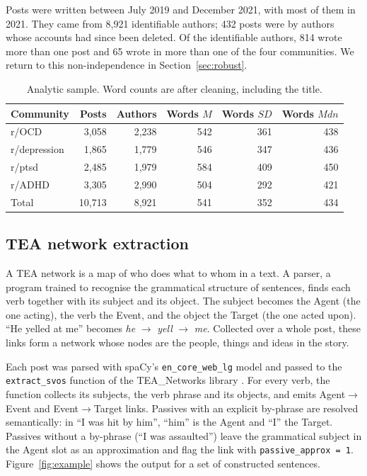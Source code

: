 \documentclass[11pt,a4paper]{article}
\begin{document}
Posts were written between July 2019 and December 2021, with most of them in 2021. They came from 8,921 identifiable authors; 432 posts were by authors whose accounts had since been deleted. Of the identifiable authors, 814 wrote more than one post and 65 wrote in more than one of the four communities. We return to this non-independence in Section~\ref{sec:robust}.

\begin{table}[t]
\centering
\caption{Analytic sample. Word counts are after cleaning, including the title.}
\label{tab:data}
\small
\begin{tabular}{@{}lrrrrr@{}}
\toprule
Community & Posts & Authors & Words $M$ & Words $SD$ & Words $Mdn$ \\
\midrule
r/OCD        & 3,058 & 2,238 & 542 & 361 & 438 \\
r/depression & 1,865 & 1,779 & 546 & 347 & 436 \\
r/ptsd       & 2,485 & 1,979 & 584 & 409 & 450 \\
r/ADHD       & 3,305 & 2,990 & 504 & 292 & 421 \\
\midrule
Total        & 10,713 & 8,921 & 541 & 352 & 434 \\
\bottomrule
\end{tabular}
\end{table}

\subsection{TEA network extraction}\label{sec:tea}

A TEA network is a map of who does what to whom in a text. A parser, a program trained to recognise the grammatical structure of sentences, finds each verb together with its subject and its object. The subject becomes the Agent (the one acting), the verb the Event, and the object the Target (the one acted upon). ``He yelled at me'' becomes \textit{he} $\to$ \textit{yell} $\to$ \textit{me}. Collected over a whole post, these links form a network whose nodes are the people, things and ideas in the story.

Each post was parsed with spaCy's \texttt{en\_core\_web\_lg} model \citep{honnibal2020spacy} and passed to the \texttt{extract\_svos} function of the TEA\_Networks library \citep{franchini2026tea}. For every verb, the function collects its subjects, the verb phrase and its objects, and emits Agent$\to$Event and Event$\to$Target links. Passives with an explicit by-phrase are resolved semantically: in ``I was hit by him'', ``him'' is the Agent and ``I'' the Target. Passives without a by-phrase (``I was assaulted'') leave the grammatical subject in the Agent slot as an approximation and flag the link with \texttt{passive\_approx = 1}. Figure~\ref{fig:example} shows the output for a set of constructed sentences.
\end{document}
